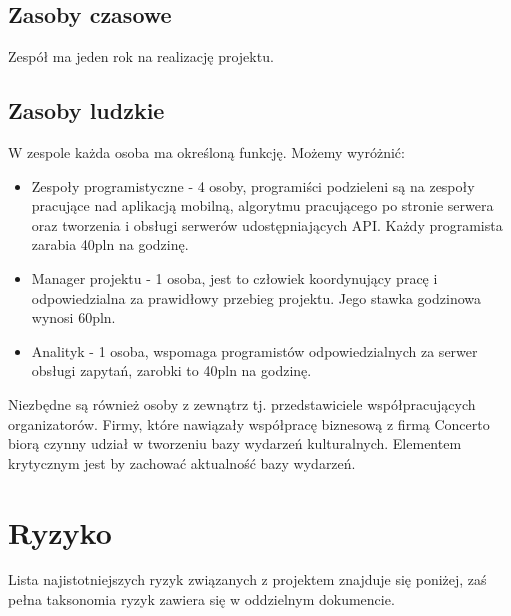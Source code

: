 \documentclass[10pt]{dokument-ppi}
\begin{document}
\subsection{Zasoby czasowe}
Zespół ma jeden rok na realizację projektu.

\subsection{Zasoby ludzkie}
W zespole każda osoba ma określoną funkcję. Możemy wyróżnić:
\begin{itemize}
  \item Zespoły programistyczne - 4 osoby, programiści podzieleni są na zespoły pracujące nad aplikacją mobilną, algorytmu pracującego po stronie serwera oraz tworzenia i obsługi serwerów udostępniających API. Każdy programista zarabia 40pln na godzinę.
  
  \item Manager projektu - 1 osoba, jest to człowiek koordynujący pracę i odpowiedzialna za prawidłowy przebieg projektu. Jego stawka godzinowa wynosi 60pln.

  \item Analityk - 1 osoba, wspomaga programistów odpowiedzialnych za serwer obsługi zapytań, zarobki to 40pln na godzinę.
\end{itemize}

Niezbędne są również osoby z zewnątrz tj. przedstawiciele współpracujących organizatorów. Firmy, które nawiązały współpracę biznesową z firmą Concerto biorą czynny udział w tworzeniu bazy wydarzeń kulturalnych. Elementem krytycznym jest by zachować aktualność bazy wydarzeń.

\section{Ryzyko}
Lista najistotniejszych ryzyk związanych z projektem znajduje się poniżej, zaś pełna taksonomia ryzyk zawiera się w oddzielnym dokumencie.
\end{document}
